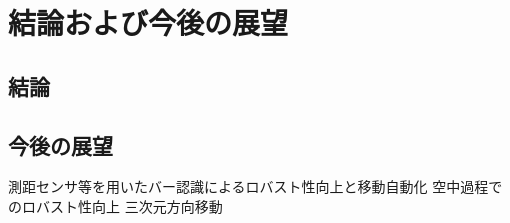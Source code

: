 \chapter[結論および今後の展望]%
{結論および今後の展望}
        \section{結論}

          

        \section{今後の展望}

        測距センサ等を用いたバー認識によるロバスト性向上と移動自動化
        空中過程でのロバスト性向上
        三次元方向移動
